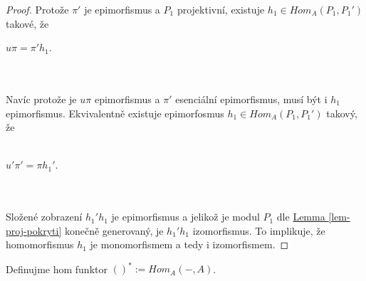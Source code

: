 \begin{proof}
      Protože $\pi'$ je epimorfismus a $P_1$ projektivní, existuje
      $h_1\in Hom_A(P_1,P_1')$ takové, že\\
      \centerline{$u\pi=\pi'h_1$.}\\\\
      Navíc protože je $u\pi$ epimorfismus a $\pi'$ esenciální epimorfismus,
      musí být i $h_1$ epimorfismus. Ekvivalentně existuje epimorfosmus 
      $h_1\in Hom_A(P_1,P_1')$ takový, že\\\\
      \centerline{$u'\pi'=\pi h_1'$.}\\\\
      Složené zobrazení $h_1'h_1$ je epimorfismus a jelikož je modul $P_1$ 
      dle \hyperref[lem-proj-pokryti]{Lemma \ref*{lem-proj-pokryti}} 
      konečně generovaný, je $h_1'h_1$ izomorfismus. To implikuje, že 
      homomorfismus $h_1$ je monomorfismem a tedy i izomorfismem.
     \end{proof}
     
     \begin{dfn}
       Definujme hom funktor $()^* := Hom_A(-,A)$. 
     \end{dfn}
     
